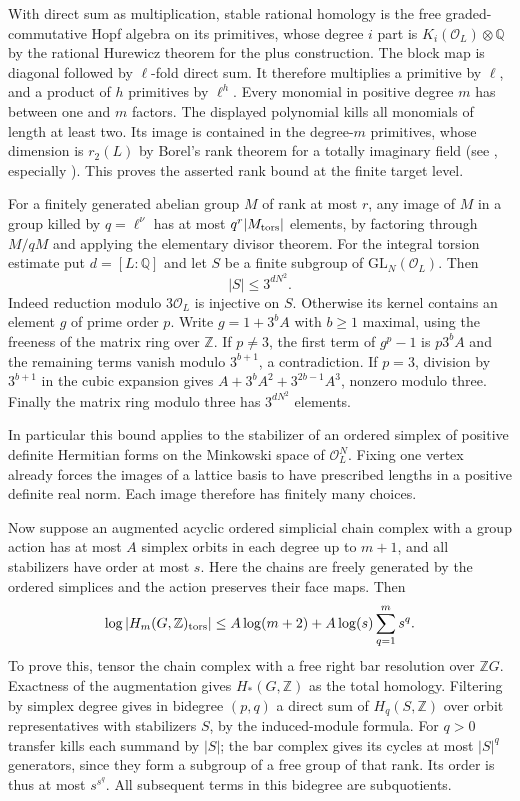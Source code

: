 \documentclass[11pt]{amsart}
\theoremstyle{definition}
\theoremstyle{remark}
\begin{document}
With direct sum as multiplication, stable rational homology is the
free graded-commutative Hopf algebra on its primitives, whose degree
$i$ part is $K_i(\mathcal O_L)\otimes\mathbb Q$ by the rational
Hurewicz theorem for the plus construction. The block map is diagonal
followed by $\ell$-fold direct sum. It therefore multiplies a
primitive by $\ell$, and a product of $h$ primitives by $\ell^h$.
Every monomial in positive degree $m$ has between one and $m$
factors. The displayed polynomial kills all monomials of length at
least two. Its image is contained in the degree-$m$ primitives,
whose dimension is $r_2(L)$ by Borel's rank theorem for a totally
imaginary field (see \cite{CharneyStab,WeibelK}, especially
\cite[IV, \S1]{WeibelK}). This proves the asserted rank bound at
the finite target level.

For a finitely generated abelian group $M$ of rank at most $r$, any
image of $M$ in a group killed by $q=\ell^\nu$ has at most
$q^r|M_{\rm tors}|$ elements, by factoring through $M/qM$ and applying
the elementary divisor theorem. For the integral torsion estimate put $d=[L:\mathbb Q]$ and let $S$ be a finite
subgroup of $\mathrm{GL}_N(\mathcal O_L)$. Then
\[
 |S|\le 3^{dN^2}.
\]
Indeed reduction modulo $3\mathcal O_L$ is injective on $S$.
Otherwise its kernel contains an element $g$ of prime order $p$.
Write $g=1+3^bA$ with $b\ge1$ maximal, using the freeness of the
matrix ring over $\mathbb Z$. If $p\ne3$, the first term of $g^p-1$
is $p3^b A$ and the remaining terms vanish modulo $3^{b+1}$,
a contradiction. If $p=3$, division by $3^{b+1}$ in the cubic
expansion gives $A+3^bA^2+3^{2b-1}A^3$, nonzero modulo three.
Finally the matrix ring modulo three has $3^{dN^2}$ elements.

In particular this bound applies to the stabilizer of an ordered
simplex of positive definite Hermitian forms on the Minkowski space
of $\mathcal O_L^N$. Fixing one vertex already forces the images of a
lattice basis to have prescribed lengths in a positive definite real
norm. Each image therefore has finitely many choices. 

Now suppose an augmented acyclic ordered simplicial
chain complex with a group action has at most $A$ simplex orbits in
each degree up to $m+1$, and all stabilizers have order at most $s$.
Here the chains are freely generated by the ordered simplices and
the action preserves their face maps. Then
\[
 \log|H_m(G,\mathbb Z)_{\rm tors}|
 \le A\log(m+2)+A\log(s)\sum_{q=1}^m s^q .
\]
To prove this, tensor the chain complex with a free right bar
resolution over $\mathbb ZG$. Exactness of the augmentation gives
$H_*(G,\mathbb Z)$ as the total homology. Filtering by simplex degree
gives in bidegree $(p,q)$ a direct sum of $H_q(S,\mathbb Z)$ over
orbit representatives with stabilizers $S$, by the induced-module
formula. For $q>0$ transfer kills each summand by $|S|$; the bar
complex gives its cycles at most $|S|^q$ generators, since they form
a subgroup of a free group of that rank. Its order is thus at most
$s^{s^q}$. All subsequent terms in this bidegree are subquotients.
\end{document}
